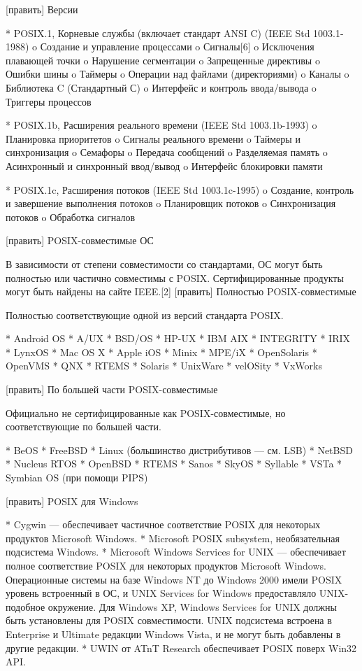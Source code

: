 [править] Версии

    * POSIX.1, Корневые службы (включает стандарт ANSI C) (IEEE Std 1003.1-1988)
          o Создание и управление процессами
          o Сигналы[6]
          o Исключения плавающей точки
          o Нарушение сегментации
          o Запрещенные директивы
          o Ошибки шины
          o Таймеры
          o Операции над файлами (директориями)
          o Каналы
          o Библиотека C (Стандартный С)
          o Интерфейс и контроль ввода/вывода
          o Триггеры процессов

    * POSIX.1b, Расширения реального времени (IEEE Std 1003.1b-1993)
          o Планировка приоритетов
          o Сигналы реального времени
          o Таймеры и синхронизация
          o Семафоры
          o Передача сообщений
          o Разделяемая память
          o Асинхронный и синхронный ввод/вывод
          o Интерфейс блокировки памяти

    * POSIX.1c, Расширения потоков (IEEE Std 1003.1c-1995)
          o Создание, контроль и завершение выполнения потоков
          o Планировщик потоков
          o Синхронизация потоков
          o Обработка сигналов

[править] POSIX-совместимые ОС

В зависимости от степени совместимости со стандартами, ОС могут быть полностью или частично совместимы с POSIX. Сертифицированные продукты могут быть найдены на сайте IEEE.[2]
[править] Полностью POSIX-совместимые

Полностью соответствующие одной из версий стандарта POSIX.

    * Android OS
    * A/UX
    * BSD/OS
    * HP-UX
    * IBM AIX
    * INTEGRITY
    * IRIX
    * LynxOS
    * Mac OS X
    * Apple iOS
    * Minix
    * MPE/iX
    * OpenSolaris
    * OpenVMS
    * QNX
    * RTEMS
    * Solaris
    * UnixWare
    * velOSity
    * VxWorks

[править] По большей части POSIX-совместимые

Официально не сертифицированные как POSIX-совместимые, но соответствующие по большей части.

    * BeOS
    * FreeBSD
    * Linux (большинство дистрибутивов — см. LSB)
    * NetBSD
    * Nucleus RTOS
    * OpenBSD
    * RTEMS
    * Sanos
    * SkyOS
    * Syllable
    * VSTa
    * Symbian OS (при помощи PIPS)

[править] POSIX для Windows

    * Cygwin — обеспечивает частичное соответствие POSIX для некоторых продуктов Microsoft Windows.
    * Microsoft POSIX subsystem, необязательная подсистема Windows.
    * Microsoft Windows Services for UNIX — обеспечивает полное соответствие POSIX для некоторых продуктов Microsoft Windows. Операционные системы на базе Windows NT до Windows 2000 имели POSIX уровень встроенный в ОС, и UNIX Services for Windows предоставляло UNIX-подобное окружение. Для Windows XP, Windows Services for UNIX должны быть установлены для POSIX совместимости. UNIX подсистема встроена в Enterprise и Ultimate редакции Windows Vista, и не могут быть добавлены в другие редакции.
    * UWIN от ATnT Research обеспечивает POSIX поверх Win32 API.

